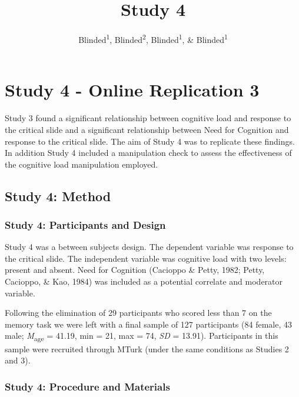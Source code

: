 \documentclass[
  american,
  man,floatsintext]{apa7}
\title{Study 4}
\author{Blinded\textsuperscript{1}, Blinded\textsuperscript{2}, Blinded\textsuperscript{1}, \& Blinded\textsuperscript{1}}
\date{}
\affiliation{\vspace{0.5cm}\textsuperscript{1} Blinded\\\textsuperscript{2} Blinded}
\begin{document}
\maketitle

\hypertarget{study-4---online-replication-3}{%
\section{Study 4 - Online Replication 3}\label{study-4---online-replication-3}}

Study 3 found a significant relationship between cognitive load and response to the critical slide and a significant relationship between Need for Cognition and response to the critical slide. The aim of Study 4 was to replicate these findings. In addition Study 4 included a manipulation check to assess the effectiveness of the cognitive load manipulation employed.

\hypertarget{study-4-method}{%
\subsection{Study 4: Method}\label{study-4-method}}

\hypertarget{study-4-participants-and-design}{%
\subsubsection{Study 4: Participants and Design}\label{study-4-participants-and-design}}

Study 4 was a between subjects design. The dependent variable was response to the critical slide. The independent variable was cognitive load with two levels: present and absent. Need for Cognition (Cacioppo \& Petty, 1982; Petty, Cacioppo, \& Kao, 1984) was included as a potential correlate and moderator variable.

Following the elimination of 29 participants who scored less than 7 on the memory task we were left with a final sample of 127 participants (84 female, 43 male; \emph{M}\textsubscript{age} = 41.19, min = 21, max = 74, \emph{SD} = 13.91). Participants in this sample were recruited through
MTurk (under the same conditions as Studies 2 and 3).

\hypertarget{study-4-procedure-and-materials}{%
\subsubsection{Study 4: Procedure and Materials}\label{study-4-procedure-and-materials}}
\end{document}

